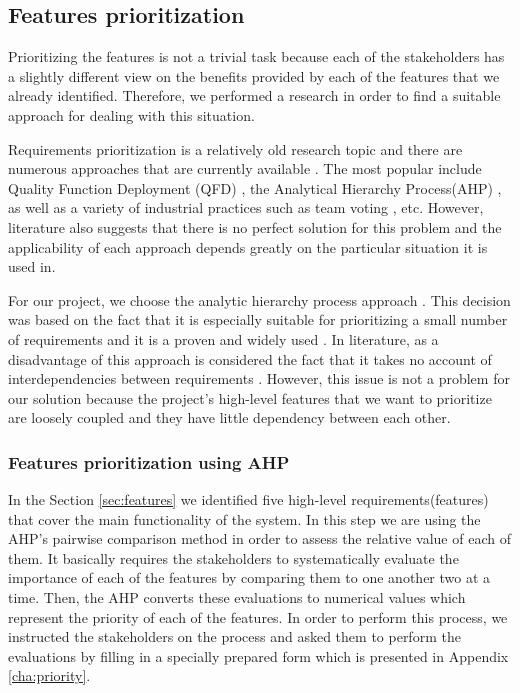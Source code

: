 \subsection{Features prioritization}

Prioritizing the features is not a trivial task because each of the stakeholders has a slightly different view on the benefits provided by each of the features that we already identified. Therefore, we performed a research in order to find a suitable approach for dealing with this situation.

Requirements prioritization is a relatively old research topic and there are numerous approaches that are currently available \cite{moisiadis2002fundamentals}. The most popular include Quality Function Deployment (QFD) \cite{chan2002quality}, the Analytical Hierarchy Process(AHP) \cite{roper1990analytic} , as well as a variety of industrial practices such as team voting \cite{moisiadis2002fundamentals}, etc. However, literature also suggests that there is no perfect solution for this problem and the applicability of each approach depends greatly on the particular situation it is used in.

For our project, we choose the analytic hierarchy process approach \cite{roper1990analytic}. This decision was based on the fact that it is especially suitable for prioritizing a small number of requirements\cite{karlsson1997cost} and it is a proven and widely used \cite{karlsson1998evaluation}. In literature, as a disadvantage of this approach is considered the fact that it takes no account of interdependencies between requirements \cite{roper1990analytic}. However, this issue is not a problem for our solution because the project's high-level features that we want to prioritize are loosely coupled and they have little dependency between each other. 


\subsubsection{Features prioritization using AHP}
In the Section \ref{sec:features} we identified five high-level requirements(features) that cover the main functionality of the system. In this step we are using the AHP's pairwise comparison method in order to assess the relative value of each of them. It basically requires the stakeholders to systematically evaluate the importance of each of the features by comparing them to one another two at a time. Then, the AHP converts these evaluations to numerical values which represent the priority of each of the features. In order to perform this process, we instructed the stakeholders on the process and asked them to perform the evaluations by filling in a specially prepared form which is presented in Appendix \ref{cha:priority}.

